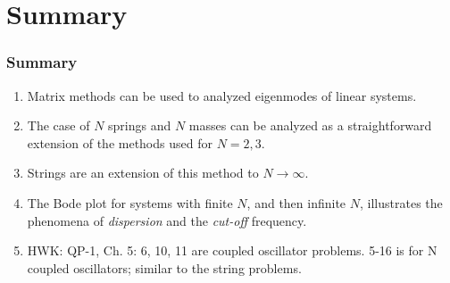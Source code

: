 \documentclass[pdf, handout, hideothersubsections]{beamer}
\begin{document}
\section{Summary}
\begin{frame}
\frametitle{Summary}
\begin{enumerate}

\item Matrix methods can be used to analyzed eigenmodes of linear systems.

\item The case of $N$ springs and $N$ masses can be analyzed as a
  straightforward extension of the methods used for $N = 2, 3$.

\item Strings are an extension of this method to $N \rightarrow \infty$.

\item The Bode plot for systems with finite $N$, and then 
infinite $N$, illustrates the phenomena of \emph{dispersion} and the
\emph{cut-off} frequency.

\item HWK: QP-1, Ch. 5: 6, 10, 11 are coupled oscillator
  problems. 5-16 is for N coupled oscillators; similar to the string problems.

\end{enumerate}
\end{frame}
\end{document}
